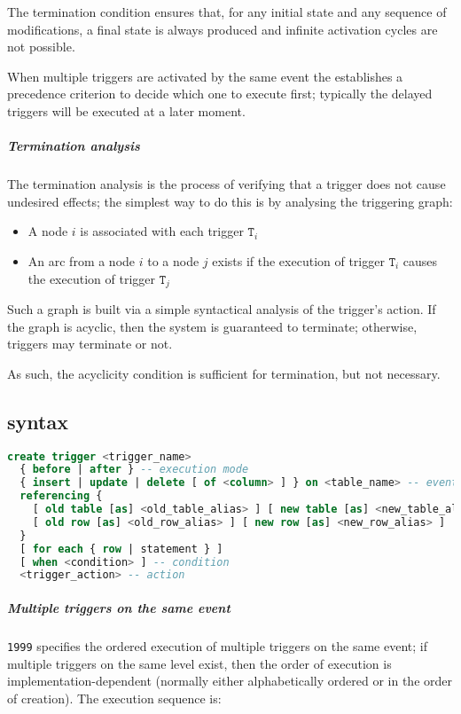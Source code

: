 \documentclass[english]{article}
\begin{document}
The termination condition ensures that, for any initial state and any sequence of modifications, a final state is always produced and infinite activation cycles are not possible.

\bigskip
When multiple triggers are activated by the same event the \dbms establishes a precedence criterion to decide which one to execute first;
typically the delayed triggers will be executed at a later moment.

\subparagraph*{Termination analysis}
The termination analysis is the process of verifying that a trigger does not cause undesired effects;
the simplest way to do this is by analysing the triggering graph:

\begin{itemize}
  \item A node \(i\) is associated with each trigger \(\texttt{T}_i\)
  \item An arc from a node \(i\) to a node \(j\) exists if the execution of trigger \(\texttt{T}_i\) causes the execution of trigger \(\texttt{T}_j\)
\end{itemize}

Such a graph is built via a simple syntactical analysis of the trigger's action.
If the graph is acyclic, then the system is guaranteed to terminate;
otherwise, triggers may terminate or not.

As such, the acyclicity condition is sufficient for termination, but not necessary.

\subsection{\sql syntax}

\begin{lstlisting}[language=SQL, caption={Trigger Syntax}, label={lst:trigger-syntax}]
create trigger <trigger_name>
  { before | after } -- execution mode
  { insert | update | delete [ of <column> ] } on <table_name> -- event
  referencing {
    [ old table [as] <old_table_alias> ] [ new table [as] <new_table_alias> ] |
    [ old row [as] <old_row_alias> ] [ new row [as] <new_row_alias> ]
  }
  [ for each { row | statement } ]
  [ when <condition> ] -- condition
  <trigger_action> -- action
\end{lstlisting}

\subparagraph*{Multiple triggers on the same event}
\sql \texttt{1999} specifies the ordered execution of multiple triggers on the same event;
if multiple triggers on the same level exist, then the order of execution is implementation-dependent (normally either alphabetically ordered or in the order of creation).
The execution sequence is:
\end{document}
